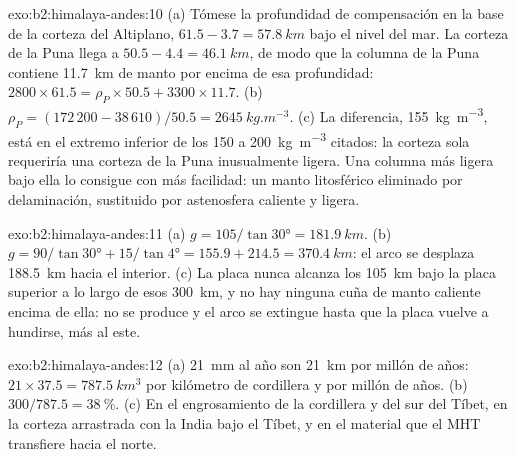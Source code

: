 \begin{solution}{exo:b2:himalaya-andes:10}
(a) Tómese la profundidad de compensación en la base de la corteza del Altiplano, $61.5 - 3.7 =
\qty{57.8}{km}$ bajo el nivel del mar. La corteza de la Puna llega a $50.5 - 4.4 = \qty{46.1}{km}$, de modo que la
columna de la Puna contiene \qty{11.7}{km} de manto por encima de esa profundidad: $2800\times61.5 =
\rho_P\times50.5 + 3300\times11.7$. (b) $\rho_P = (172\,200 - 38\,610)/50.5 =
\qty{2645}{kg.m^{-3}}$. (c) La diferencia, \qty{155}{kg.m^{-3}}, está en el extremo inferior de
los 150 a \qty{200}{kg.m^{-3}} citados: la corteza sola requeriría una corteza de la Puna inusualmente ligera.
Una columna más ligera bajo ella lo consigue con más facilidad: un manto litosférico eliminado por delaminación,
sustituido por astenosfera caliente y ligera.
\end{solution}

\begin{solution}{exo:b2:himalaya-andes:11}
(a) $g = 105/\tan\ang{30} = \qty{181.9}{km}$. (b) $g = 90/\tan\ang{30} + 15/\tan\ang{4} =
155.9 + 214.5 = \qty{370.4}{km}$: el arco se desplaza \qty{188.5}{km} hacia el interior. (c) La placa nunca
alcanza los \qty{105}{km} bajo la placa superior a lo largo de esos \qty{300}{km}, y no hay ninguna cuña de manto caliente
encima de ella: no se produce  y el arco se extingue hasta que la placa vuelve a hundirse, más al este.
\end{solution}

\begin{solution}{exo:b2:himalaya-andes:12}
(a) \qty{21}{mm} al año son \qty{21}{km} por millón de años: $21\times37.5 =
\qty{787.5}{km^3}$ por kilómetro de cordillera y por millón de años. (b) $300/787.5 =
\qty{38}{\percent}$. (c) En el engrosamiento de la cordillera y del sur del Tíbet, en la corteza
arrastrada con la India bajo el Tíbet, y en el material que el MHT transfiere hacia el norte.
\end{solution}

